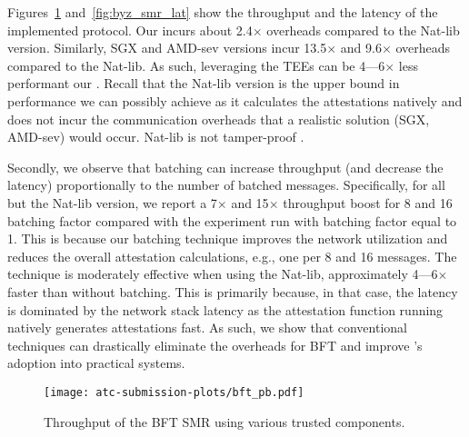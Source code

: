  Figures~\ref{fig:byz_smr_throuthput} and~\ref{fig:byz_smr_lat} show the throughput and the latency of the implemented protocol. Our \projecttitle{} incurs about 2.4$\times$ overheads compared to the Nat-lib version. Similarly, SGX and AMD-sev versions incur 13.5$\times$ and 9.6$\times$ overheads compared to the Nat-lib. As such, leveraging the TEEs can be 4---6$\times$ less performant our \projecttitle{}. Recall that the Nat-lib version is the upper bound in performance we can possibly achieve as it calculates the attestations natively and does not incur the communication overheads that a realistic solution (SGX, AMD-sev) would occur. Nat-lib is not tamper-proof .


Secondly, we observe that batching can increase throughput (and decrease the latency) proportionally to the number of batched messages. Specifically, for all but the Nat-lib version, we report a 7$\times$ and 15$\times$ throughput boost for 8 and 16 batching factor compared with the experiment run with batching factor equal to 1. This is because our batching technique improves the network utilization and reduces the overall attestation calculations, e.g., one per 8 and 16 messages. The technique is moderately effective when using the Nat-lib, approximately 4---6$\times$ faster than without batching. This is primarily because, in that case, the latency is dominated by the network stack latency as the attestation function running natively generates attestations fast. As such, we show that conventional techniques can drastically eliminate the overheads for BFT and improve \projecttitle{}'s adoption into practical systems.


\begin{figure}[t!]
    \centering
    \texttt{[image: atc-submission-plots/bft\_pb.pdf]} 
    \caption{Throughput of the BFT SMR using various trusted components.} \label{fig:byz_smr_throuthput}
\end{figure}




